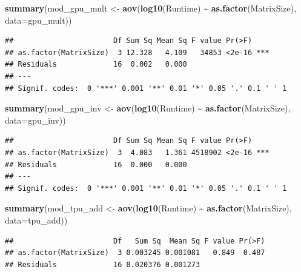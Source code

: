 \documentclass[
]{article}
\newenvironment{Shaded}{\begin{snugshade}}{\end{snugshade}}
\newcommand{\DataTypeTok}[1]{\textcolor[rgb]{0.13,0.29,0.53}{#1}}
\newcommand{\KeywordTok}[1]{\textcolor[rgb]{0.13,0.29,0.53}{\textbf{#1}}}
\newcommand{\NormalTok}[1]{#1}
\newcommand{\OperatorTok}[1]{\textcolor[rgb]{0.81,0.36,0.00}{\textbf{#1}}}
\newcommand{\StringTok}[1]{\textcolor[rgb]{0.31,0.60,0.02}{#1}}
\begin{document}
\begin{Shaded}
\begin{Highlighting}[]
\KeywordTok{summary}\NormalTok{(mod\_gpu\_mult \textless{}{-}}\StringTok{ }\KeywordTok{aov}\NormalTok{(}\KeywordTok{log10}\NormalTok{(Runtime) }\OperatorTok{\textasciitilde{}}\StringTok{ }\KeywordTok{as.factor}\NormalTok{(MatrixSize), }\DataTypeTok{data=}\NormalTok{gpu\_mult))}
\end{Highlighting}
\end{Shaded}

\begin{verbatim}
##                       Df Sum Sq Mean Sq F value Pr(>F)    
## as.factor(MatrixSize)  3 12.328   4.109   34853 <2e-16 ***
## Residuals             16  0.002   0.000                   
## ---
## Signif. codes:  0 '***' 0.001 '**' 0.01 '*' 0.05 '.' 0.1 ' ' 1
\end{verbatim}

\begin{Shaded}
\begin{Highlighting}[]
\KeywordTok{summary}\NormalTok{(mod\_gpu\_inv \textless{}{-}}\StringTok{ }\KeywordTok{aov}\NormalTok{(}\KeywordTok{log10}\NormalTok{(Runtime) }\OperatorTok{\textasciitilde{}}\StringTok{ }\KeywordTok{as.factor}\NormalTok{(MatrixSize), }\DataTypeTok{data=}\NormalTok{gpu\_inv))}
\end{Highlighting}
\end{Shaded}

\begin{verbatim}
##                       Df Sum Sq Mean Sq F value Pr(>F)    
## as.factor(MatrixSize)  3  4.083   1.361 4518902 <2e-16 ***
## Residuals             16  0.000   0.000                   
## ---
## Signif. codes:  0 '***' 0.001 '**' 0.01 '*' 0.05 '.' 0.1 ' ' 1
\end{verbatim}

\begin{Shaded}
\begin{Highlighting}[]
\KeywordTok{summary}\NormalTok{(mod\_tpu\_add \textless{}{-}}\StringTok{ }\KeywordTok{aov}\NormalTok{(}\KeywordTok{log10}\NormalTok{(Runtime) }\OperatorTok{\textasciitilde{}}\StringTok{ }\KeywordTok{as.factor}\NormalTok{(MatrixSize), }\DataTypeTok{data=}\NormalTok{tpu\_add))}
\end{Highlighting}
\end{Shaded}

\begin{verbatim}
##                       Df   Sum Sq  Mean Sq F value Pr(>F)
## as.factor(MatrixSize)  3 0.003245 0.001081   0.849  0.487
## Residuals             16 0.020376 0.001273
\end{verbatim}
\end{document}
